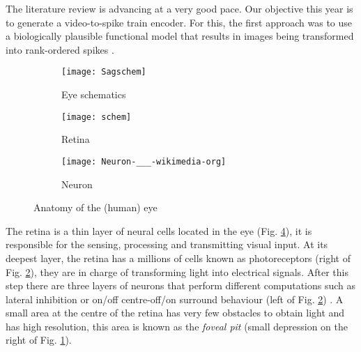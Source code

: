 The literature review is advancing at a very good pace. Our objective this year 
is to generate a video-to-spike train encoder. For this, the first approach was 
to use a biologically plausible functional model \cite{basab-model} that 
results in images being transformed into rank-ordered spikes 
\cite{thorpe-spike-rapid-processing}.

\begin{figure}[hbt]
  \centering
  \begin{subfigure}[b]{0.15\textwidth}
    \centering
    \texttt{[image: Sagschem]}
    \caption{Eye schematics}
    \label{sub-fig-eye-schematics}
  \end{subfigure}
  \begin{subfigure}[b]{0.15\textwidth}
    \centering
    \texttt{[image: schem]}
    \caption{Retina}
    \label{sub-fig-retinal-layers}
  \end{subfigure}
  \begin{subfigure}[b]{0.15\textwidth}
    \centering
    \texttt{[image: Neuron-\_\_\_-wikimedia-org]}
    \caption{Neuron}
    \label{sub-fig-neuron}
  \end{subfigure}
  
  \caption{Anatomy of the (human) eye }
  \label{fig-basic-eye-anatomy}
\end{figure}

The retina is a thin layer of neural cells located in the eye (Fig. 
\ref{fig-basic-eye-anatomy}), it is responsible
for the sensing, processing and transmitting visual input\cite{webvision}. 
At its deepest layer, the retina has a millions of cells known as 
photoreceptors (right of Fig. \ref{sub-fig-retinal-layers}), they are in charge 
of transforming light into electrical 
signals. After this step there are three layers of neurons that 
perform different computations such as lateral inhibition or on/off 
centre-off/on surround behaviour (left of Fig. \ref{sub-fig-retinal-layers})
\cite{webvision, basab-model}. A small area 
at the centre of the retina has very few obstacles to obtain light and has high
resolution, this area is known as the \emph{foveal pit} (small depression on 
the right of Fig. \ref{sub-fig-eye-schematics}).

